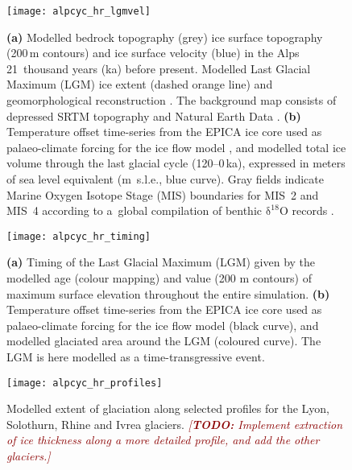 \documentclass{article}
\newcommand{\todo}[1]{\textcolor{darkred}{\emph{[\textbf{TODO:} #1]}}}
\newcommand{\chem}[1]{\ensuremath{\mathrm{#1}}}
\begin{document}
    \begin{figure}
      \centerline{\texttt{[image: alpcyc\_hr\_lgmvel]}}
      \caption{%
        \textbf{(a)} Modelled bedrock topography (grey) ice surface topography
        (200\,m contours) and ice surface velocity (blue) in the Alps
        21~thousand years (ka) before present. Modelled Last Glacial Maximum
        (LGM) ice extent (dashed orange line) and geomorphological
        reconstruction \citep[solid red line,][]{Ehlers.etal.2011}. The
        background map consists of depressed SRTM \citep{Jarvis.etal.2008}
        topography and Natural Earth Data \citep{Patterson.Kelso.2015}.
        \textbf{(b)} Temperature offset time-series from the EPICA ice core
        used as palaeo-climate forcing for the ice flow model \citep[black
        curve,][]{Jouzel.etal.2007}, and modelled total ice volume through the
        last glacial cycle (120--0\,ka), expressed in meters of sea level
        equivalent (m~s.l.e., blue curve). Gray fields indicate Marine
        Oxygen Isotope Stage (MIS) boundaries for MIS~2 and MIS~4 according to
        a~global compilation of benthic \chem{\delta^{18}O} records
        \citep{Lisiecki.Raymo.2005}.}
      \label{fig:lgmvel}
    \end{figure}

    \begin{figure}
      \centerline{\texttt{[image: alpcyc\_hr\_timing]}}
      \caption{%
        \textbf{(a)} Timing of the Last Glacial Maximum (LGM) given by the
        modelled age (colour mapping) and value (200 m contours) of maximum
        surface elevation throughout the entire simulation.
        \textbf{(b)} Temperature offset time-series from the EPICA ice core
        used as palaeo-climate forcing for the ice flow model (black curve),
        and modelled glaciated area around the LGM (coloured curve). The LGM
        is here modelled as a time-transgressive event.}
      \label{fig:timing}
    \end{figure}

    \begin{figure}
      \centerline{\texttt{[image: alpcyc\_hr\_profiles]}}
      \caption{%
        Modelled extent of glaciation along selected profiles for the Lyon,
        Solothurn, Rhine and Ivrea glaciers.
        \todo{Implement extraction of ice thickness along a more detailed
              profile, and add the other glaciers.}}
      \label{fig:profiles}
    \end{figure}
\end{document}
